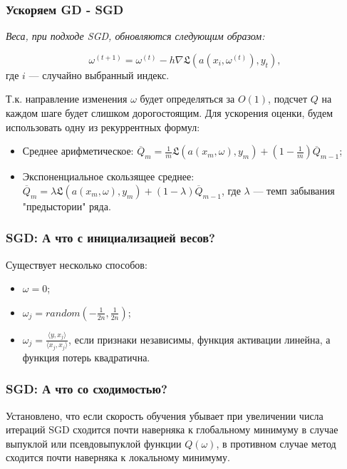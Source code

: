 \documentclass[11pt]{beamer}
\begin{document}
	\begin{frame}
		\frametitle{Ускоряем GD - SGD}
		\textit{Веса, при подходе SGD, обновляются следующим образом:}
		
		$$ \omega^{(t+1)} = \omega^{(t)} - h\nabla\mathfrak{L}(a(x_i, \omega^{(t)}), y_t),$$ где $ i $ --- случайно выбранный индекс.
		
		Т.к. направление изменения $ \omega $ будет определяться за $ O(1) $, подсчет $ Q $ на каждом шаге будет слишком дорогостоящим. Для ускорения оценки, будем использовать одну из рекуррентных формул:
		\begin{itemize}
			\item Среднее арифметическое: $ \overline Q_m = \frac{1}{m}\mathfrak{L}(a(x_m, \omega), y_m) + (1 - \frac{1}{m}) \overline Q_{m-1}$;
			\item Экспоненциальное скользящее среднее: $ \overline Q_m = \lambda\mathfrak{L}(a(x_m, \omega), y_m) + (1 - \lambda) \overline Q_{m-1}$, где $ \lambda $ --- темп забывания "предыстории" ряда.
		\end{itemize}
	\end{frame}

	\begin{frame}
		\frametitle{SGD: А что с инициализацией весов?}
		Существует несколько способов:
		\begin{itemize}
			\item $ \omega = 0 $;
			\item $ \omega_j = random(-\frac{1}{2n}, \frac{1}{2n}) $;
			\item $ \omega_j = \frac{\langle y, x_j \rangle}{\langle x_j, x_j \rangle} $, если признаки независимы, функция активации линейна, а функция потерь квадратична.
		\end{itemize}
	\end{frame}

	\begin{frame}
		\frametitle{SGD: А что со сходимостью?}
		Установлено, что если скорость обучения убывает при увеличении числа итераций SGD сходится почти наверняка к глобальному минимуму в случае выпуклой или псевдовыпуклой функции $ Q(\omega) $, в противном случае метод сходится почти наверняка к локальному минимуму.
	\end{frame}
\end{document}
